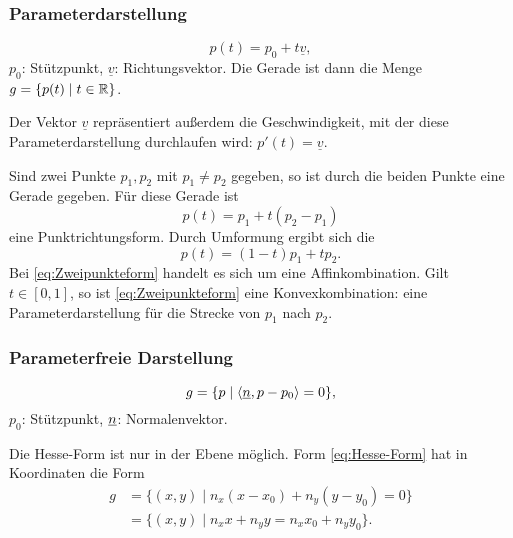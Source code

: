 \subsubsection{Parameterdarstellung}

\begin{equation}
p(t) = p_0+t\underline v,
\end{equation}
$p_0$: Stützpunkt, $\underline v$: Richtungsvektor.
Die Gerade ist dann die Menge $g=\{p(t)\mid t\in\mathbb R\}$.

Der Vektor $\underline v$ repräsentiert außerdem die Geschwindigkeit,
mit der diese Parameterdarstellung durchlaufen wird:
$p'(t)=\underline v$.

Sind zwei Punkte $p_1,p_2$ mit $p_1\ne p_2$ gegeben, so ist
durch die beiden Punkte eine Gerade gegeben. Für diese Gerade ist
\begin{equation}
p(t) = p_1+t(p_2-p_1)
\end{equation}
eine Punktrichtungsform.
Durch Umformung ergibt sich die 
\begin{equation}\label{eq:Zweipunkteform}
p(t) = (1-t)p_1+tp_2.
\end{equation}
Bei \eqref{eq:Zweipunkteform} handelt es sich um eine
Affinkombination. Gilt $t\in[0,1]$, so ist \eqref{eq:Zweipunkteform}
eine Konvexkombination: eine Parameterdarstellung für die Strecke
von $p_1$ nach $p_2$.

\subsubsection{Parameterfreie Darstellung}
\begin{equation}\label{eq:Hesse-Form}
g = \{p\mid\langle \underline{n},p-p_0\rangle = 0\},
\end{equation}
$p_0$: Stützpunkt, $\underline{n}$: Normalenvektor.

Die Hesse-Form ist nur in der Ebene möglich.
Form \eqref{eq:Hesse-Form} hat in Koordinaten
die Form
\begin{equation}
\begin{split}
g &= \{(x,y)\mid n_x(x-x_0)+n_y(y-y_0)=0\}\\
&= \{(x,y)\mid n_x x+n_y y = n_x x_0+n_y y_0\}.
\end{split}
\end{equation}

